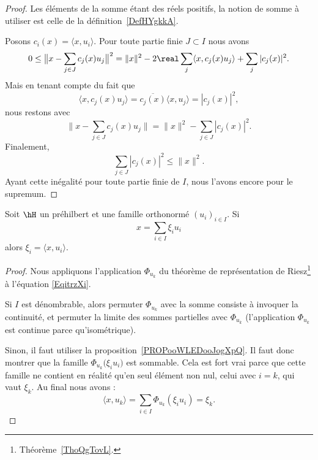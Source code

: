 \begin{proof}
	Les éléments de la somme étant des réels positifs, la notion de somme à utiliser est celle de la définition~\ref{DefHYgkkA}.

	Posons \( c_i(x)=\langle x, u_i\rangle \). Pour toute partie finie \( J\subset I\) nous avons
	\begin{equation}
		0\leq \big\| x-\sum_{j\in J}c_j(x)u_j \big\|^2=\| x \|^2-2\real\sum_{j}\langle x, c_j(x)u_j\rangle +\sum_j| c_j(x) |^2.
	\end{equation}
	Mais en tenant compte du fait que
	\begin{equation}
		\langle x, c_j(x)u_j\rangle =\overline{  c_j(x)}\langle x, u_j\rangle =| c_j(x) |^2,
	\end{equation}
	nous restons avec
	\begin{equation}    \label{EqvwXWEA}
		\| x-\sum_{j\in J}c_j(x)u_j \|=\| x \|^2-\sum_{j\in J}| c_j(x) |^2.
	\end{equation}
	Finalement,
	\begin{equation}
		\sum_{j\in J}| c_j(x) |^2\leq \| x \|^2.
	\end{equation}
	Ayant cette inégalité pour toute partie finie de \( I\), nous l'avons encore pour le supremum.
\end{proof}

\begin{proposition}     \label{PROPooWTOZooYZdlml}
	Soit \( \hH\) un préhilbert et une famille orthonormé \( (u_i)_{i\in I} \). Si
	\begin{equation}        \label{EqitrzXi}
		x=\sum_{i\in I}\xi_iu_i
	\end{equation}
	alors \( \xi_i=\langle x, u_i\rangle \).
\end{proposition}

\begin{proof}
	Nous appliquons l'application \( \Phi_{u_k}\) du théorème de représentation de Riesz\footnote{Théorème~\ref{ThoQgTovL}.} à l'équation \eqref{EqitrzXi}.

	Si \( I\) est dénombrable, alors permuter \( \Phi_{u_k}\) avec la somme consiste à invoquer la continuité, et permuter la limite des sommes partielles avec \( \Phi_{u_k}\) (l'application \( \Phi_{u_k}\) est continue parce qu'isométrique).

	Sinon, il faut utiliser la proposition~\ref{PROPooWLEDooJogXpQ}. Il faut donc montrer que la famille \( \Phi_{u_k}\big( \xi_iu_i \big)\) est sommable. Cela est fort vrai parce que cette famille ne contient en réalité qu'en seul élément non nul, celui avec \( i=k\), qui vaut \( \xi_k\). Au final nous avons :
	\begin{equation}
		\langle x, u_k\rangle =\sum_{i\in I}\Phi_{u_k}(\xi_iu_i)=\xi_k.
	\end{equation}
\end{proof}

